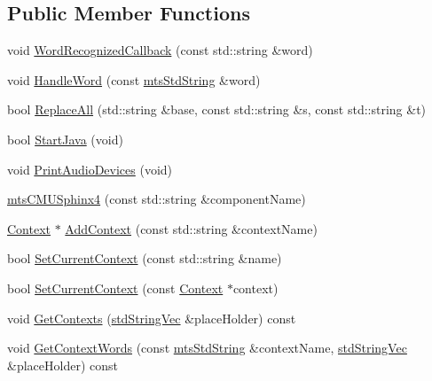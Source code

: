 \subsection*{Public Member Functions}
\begin{DoxyCompactItemize}
\item 
void \hyperlink{classmts_c_m_u_sphinx4_ac9243489a568cce1c463922dc0f79bbb}{Word\+Recognized\+Callback} (const std\+::string \&word)
\item 
void \hyperlink{classmts_c_m_u_sphinx4_a653084b6693c6f4414bc8dfa8f94162e}{Handle\+Word} (const \hyperlink{mts_generic_object_proxy_8h_adbc21bfbf98367e582bf8a263b7e711f}{mts\+Std\+String} \&word)
\item 
bool \hyperlink{classmts_c_m_u_sphinx4_adb303121fc94c17e9c57d11fb076febb}{Replace\+All} (std\+::string \&base, const std\+::string \&s, const std\+::string \&t)
\item 
bool \hyperlink{classmts_c_m_u_sphinx4_a1fa53d9230463e3fffc5da3d6d860bac}{Start\+Java} (void)
\item 
void \hyperlink{classmts_c_m_u_sphinx4_a820a87d010d678ea90ec349119b1157f}{Print\+Audio\+Devices} (void)
\item 
\hyperlink{classmts_c_m_u_sphinx4_ae0672d164dc504f26d68986684997d21}{mts\+C\+M\+U\+Sphinx4} (const std\+::string \&component\+Name)
\item 
\hyperlink{classmts_c_m_u_sphinx4_1_1_context}{Context} $\ast$ \hyperlink{classmts_c_m_u_sphinx4_a349e1ce0312d5921dcd2810977ff7545}{Add\+Context} (const std\+::string \&context\+Name)
\item 
bool \hyperlink{classmts_c_m_u_sphinx4_a5b072af7ea052d31764f28b598731d86}{Set\+Current\+Context} (const std\+::string \&name)
\item 
bool \hyperlink{classmts_c_m_u_sphinx4_aaf2723a879577249f27da70aeac5108a}{Set\+Current\+Context} (const \hyperlink{classmts_c_m_u_sphinx4_1_1_context}{Context} $\ast$context)
\item 
void \hyperlink{classmts_c_m_u_sphinx4_ad2db81a9bc569fb09174abdc524fa2af}{Get\+Contexts} (\hyperlink{mts_generic_object_proxy_8h_ae2238149254430b4959aa4e16892fc07}{std\+String\+Vec} \&place\+Holder) const 
\item 
void \hyperlink{classmts_c_m_u_sphinx4_a691e451e7489413f2aa73a9ffeb11014}{Get\+Context\+Words} (const \hyperlink{mts_generic_object_proxy_8h_adbc21bfbf98367e582bf8a263b7e711f}{mts\+Std\+String} \&context\+Name, \hyperlink{mts_generic_object_proxy_8h_ae2238149254430b4959aa4e16892fc07}{std\+String\+Vec} \&place\+Holder) const 

\end{DoxyCompactItemize}
